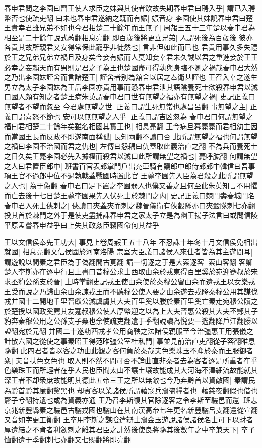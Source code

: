 春申君問之李園曰齊王使人求臣之妹與其使者飲故失期春申君曰聘入乎|{
	謂已入聘幣否也使疏吏翻}
曰未也春申君遂納之既而有娠|{
	娠音身}
李園使其妹說春申君曰楚王貴幸君雖兄弟不如也今君相楚二十餘年而王無子|{
	周赧王五十三年楚以春申君為相至是二十餘年說式芮翻相息亮翻}
即百歲後將更立兄弟|{
	人謂死後為百歲後}
彼亦各貴其故所親君又安得常保此寵乎非徒然也|{
	言非但如此而已也}
君貴用事久多失禮於王之兄弟兄弟立禍且及身矣今妾有娠而人莫知妾幸君未久誠以君之重進妾於王王必幸之妾賴天而有男則是君之子為王也楚國盡可得孰與身臨不測之禍哉春申君大然之乃出李園妹謹舍而言諸楚王|{
	謹舍者别為舘舍以居之奉衛甚謹也}
王召入幸之遂生男立為太子李園妹為王后李園亦貴用事而恐春申君泄其語陰養死士欲殺春申君以滅口國人頗有知之者楚王病朱英謂春申君曰世有無望之福亦有無望之禍|{
	史記正義曰無望者不望而忽至}
今君處無望之世|{
	正義曰謂生死無常也處昌呂翻}
事無望之主|{
	正義曰謂喜怒不節也}
安可以無無望之人乎|{
	正義曰謂吉凶忽為}
春申君曰何謂無望之福曰君相楚二十餘年矣雖名相國其實王也|{
	相息亮翻}
王今病旦暮薨薨而君相幼主因而當國王長而反政不即遂南面稱孤|{
	長知兩翻不讀曰否}
此所謂無望之福也何謂無望之禍曰李園不治國而君之仇也|{
	左傳曰怨耦曰仇蓋取此義治直之翻}
不為兵而養死士之日久矣王薨李園必先入據權而殺君以滅口此所謂無望之禍也|{
	薨呼肱翻}
何謂無望之人曰君置臣郎中|{
	班書百官表郎掌門戶出充車騎有議郎中郎侍郎郎中韓信曰吾事項王官不過郎中位不過執戟蓋戰國時置此官}
王薨李園先入臣為君殺之此所謂無望之人也|{
	為于偽翻}
春申君曰足下置之李園弱人也僕又善之且何至此朱英知言不用懼而亡去後十七日楚王薨李園果先入伏死士於棘門之内|{
	史記正義曰棘門壽春城門名}
春申君入死士俠刺之|{
	俠讀曰夾蓋夾而刺之魏晉儀衛有俠轂隊亦曰夾轂隊刺七亦翻}
投其首於棘門之外于是使吏盡捕誅春申君之家太子立是為幽王揚子法言曰或問信陵平原孟嘗春申益乎曰上失其政姦臣竊國命何其益乎

王以文信侯奉先王功大|{
	事見上卷周赧王五十八年}
不忍誅十年冬十月文信侯免相出就國|{
	相息亮翻文信侯國於河南洛陽}
宗室大臣議曰諸侯人來仕者皆為其主遊間耳|{
	謂遊說以間秦之君臣為于偽翻間古莧翻}
請一切逐之于是大索逐客|{
	索山客翻}
客卿楚人李斯亦在逐中行且上書曰昔穆公求士西取由余於戎東得百里奚於宛迎蹇叔於宋求丕豹公孫支於晉|{
	上時掌翻史記戎王使由余使於秦穆公留由余而遺戎王以女樂戎王受而說之乃歸由余由余諫戎王而不聽穆公使人要之由余遂去戎降秦穆公用其謀伐戎并國十二開地千里晉獻公滅虞虜其大夫百里奚以媵於秦百里奚亡秦走宛穆公贖之於楚授以國政奚薦其友蹇叔穆公使人厚幣迎之以為上大夫晉惠公殺其大夫丕鄭其子豹奔秦穆公用之公孫支子桑也余使疏吏翻遺于季翻說讀為悦要一遙翻降戶江翻媵以證翻宛於元翻}
并國二十遂覇西戎孝公用商鞅之法諸侯親服至今治彊惠王用張儀之計散六國之從使之事秦昭王得范睢彊公室杜私門|{
	事並見前治直吏翻從子容翻睢息隨翻}
此四君者皆以客之功由此觀之客何負於秦哉夫色樂珠玉不產於秦而王服御者衆|{
	夫音扶色女色也}
取人則不然不問可否不論曲直非秦者去為客者逐是所重者在乎色樂珠玉而所輕者在乎人民也臣聞太山不讓土壤故能成其大河海不澤細流故能就其深王者不却衆庶故能明其德此五帝三王之所以無敵也今乃弃黔首以資敵國|{
	秦謂民為黔首黔其廉翻黧黑也}
却賓客以業諸侯所謂藉寇兵齎盗糧者也|{
	藉慈夜翻假也借也齎子兮翻持遺也或為資義亦通}
王乃召李斯復其官除逐客之令李斯至驪邑而還|{
	班志京兆新豐縣秦之驪邑古驪戎國也驪山在其南漢高帝七年更名新豐驪呂支翻還從宣翻又音如字更工衡翻}
王卒用李斯之謀陰遣辯士齎金玉遊說諸侯諸侯名士可下以財者厚遺結之不肯者利劒刺之離其君臣之計然後使良將隨其後數年之中卒兼天下|{
	卒子恤翻遺于季翻刺七亦翻又七賜翻將即亮翻}


